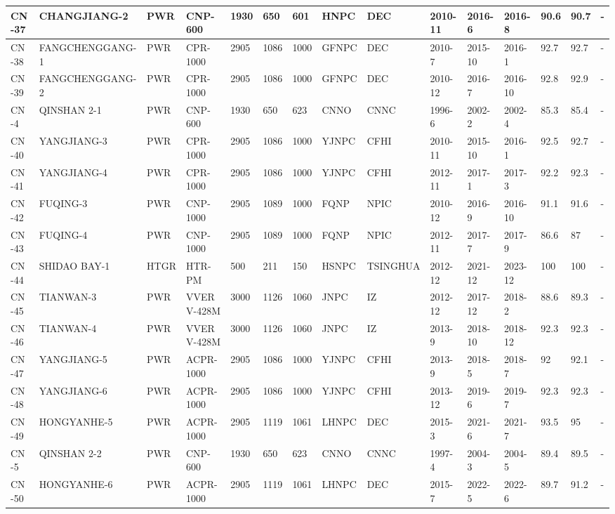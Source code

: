 \begin{table}
\begin{tabular}{|l|l|l|l|l|l|l|l|l|l|l|l|l|l|}
    CN -37 & CHANGJIANG-2 & PWR & CNP-600 & 1930 & 650 & 601 & HNPC & DEC & 2010-11 & 2016-6 & 2016-8 & 90.6 & 90.7 & - \\ \hline
    CN -38 & FANGCHENGGANG-1 & PWR & CPR-1000 & 2905 & 1086 & 1000 & GFNPC & DEC & 2010-7 & 2015-10 & 2016-1 & 92.7 & 92.7 & - \\ \hline
    CN -39 & FANGCHENGGANG-2 & PWR & CPR-1000 & 2905 & 1086 & 1000 & GFNPC & DEC & 2010-12 & 2016-7 & 2016-10 & 92.8 & 92.9 & - \\ \hline
    CN -4 & QINSHAN 2-1 & PWR & CNP-600 & 1930 & 650 & 623 & CNNO & CNNC & 1996-6 & 2002-2 & 2002-4 & 85.3 & 85.4 & - \\ \hline
    CN -40 & YANGJIANG-3 & PWR & CPR-1000 & 2905 & 1086 & 1000 & YJNPC & CFHI & 2010-11 & 2015-10 & 2016-1 & 92.5 & 92.7 & - \\ \hline
    CN -41 & YANGJIANG-4 & PWR & CPR-1000 & 2905 & 1086 & 1000 & YJNPC & CFHI & 2012-11 & 2017-1 & 2017-3 & 92.2 & 92.3 & - \\ \hline
    CN -42 & FUQING-3 & PWR & CNP-1000 & 2905 & 1089 & 1000 & FQNP & NPIC & 2010-12 & 2016-9 & 2016-10 & 91.1 & 91.6 & - \\ \hline
    CN -43 & FUQING-4 & PWR & CNP-1000 & 2905 & 1089 & 1000 & FQNP & NPIC & 2012-11 & 2017-7 & 2017-9 & 86.6 & 87 & - \\ \hline
    CN -44 & SHIDAO BAY-1 & HTGR & HTR-PM & 500 & 211 & 150 & HSNPC & TSINGHUA & 2012-12 & 2021-12 & 2023-12 & 100 & 100 & - \\ \hline
    CN -45 & TIANWAN-3 & PWR & VVER V-428M & 3000 & 1126 & 1060 & JNPC & IZ & 2012-12 & 2017-12 & 2018-2 & 88.6 & 89.3 & - \\ \hline
    CN -46 & TIANWAN-4 & PWR & VVER V-428M & 3000 & 1126 & 1060 & JNPC & IZ & 2013-9 & 2018-10 & 2018-12 & 92.3 & 92.3 & - \\ \hline
    CN -47 & YANGJIANG-5 & PWR & ACPR-1000 & 2905 & 1086 & 1000 & YJNPC & CFHI & 2013-9 & 2018-5 & 2018-7 & 92 & 92.1 & - \\ \hline
    CN -48 & YANGJIANG-6 & PWR & ACPR-1000 & 2905 & 1086 & 1000 & YJNPC & CFHI & 2013-12 & 2019-6 & 2019-7 & 92.3 & 92.3 & - \\ \hline
    CN -49 & HONGYANHE-5 & PWR & ACPR-1000 & 2905 & 1119 & 1061 & LHNPC & DEC & 2015-3 & 2021-6 & 2021-7 & 93.5 & 95 & - \\ \hline
    CN -5 & QINSHAN 2-2 & PWR & CNP-600 & 1930 & 650 & 623 & CNNO & CNNC & 1997-4 & 2004-3 & 2004-5 & 89.4 & 89.5 & - \\ \hline
    CN -50 & HONGYANHE-6 & PWR & ACPR-1000 & 2905 & 1119 & 1061 & LHNPC & DEC & 2015-7 & 2022-5 & 2022-6 & 89.7 & 91.2 & - \\ \hline

\end{tabular}
\end{table}
